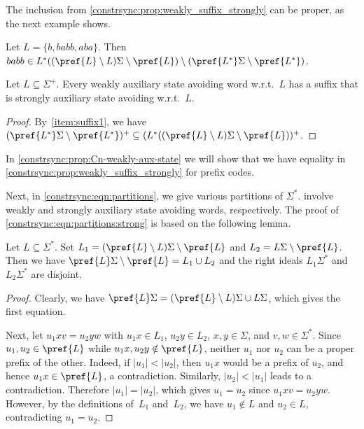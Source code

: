 The inclusion from \cref{constrsync:prop:weakly_suffix_strongly} can be proper,
as the next example shows.

\begin{example}
	Let $L = \{b, babb, aba\}$.
	Then $babb \in L^* ( ( \pref{L} \setminus L )\Sigma \setminus \pref{L} ) \setminus ( \pref{L^*}\Sigma  \setminus \pref{L^*} )$.
\end{example} 

\begin{corollary} \label{constrsync:cor:weakly_suffix_strongly}  \label{item:suffix2}
	Let $L \subseteq \Sigma^+$. Every weakly auxiliary state avoiding word w.r.t.~$L$
	has a suffix that is strongly auxiliary state avoiding w.r.t.~$L$.
\end{corollary}
\begin{proof}
	By~\cref{item:suffix1}, we have
	$(\pref{L^*}\Sigma  \setminus \pref{L^*})^+ \subseteq ( L^* ( ( \pref{L} \setminus L )\Sigma \setminus \pref{L} ) )^+$.	
\end{proof}

In \cref{constrsync:prop:Cn-weakly-aux-state}
we will show that 
we have equality in \cref{constrsync:prop:weakly_suffix_strongly}
for prefix codes.



Next, in \cref{constrsync:eqn:partitions}, we give various partitions of $\Sigma^*$.
involve weakly and strongly auxiliary state avoiding words, respectively.
The proof of \cref{constrsync:eqn:partitions:strong} is based on the following lemma.

\begin{lemma} \label{constrsync:lem:properpref}
	Let $L \subseteq \Sigma^*$.
	Set $L_1 = (\pref{L} \setminus L)\Sigma \setminus \pref{L}$
	and $L_2 =  L\Sigma  \setminus \pref{L}$.
	Then we have $\pref{L}\Sigma \setminus \pref{L} = L_1 \cup L_2$
	and the right ideals $L_1 \Sigma^*$
	and $L_2 \Sigma^*$ are disjoint.
\end{lemma}
\begin{proof}
	Clearly, we have $\pref{L}\Sigma = (\pref{L}\setminus L)\Sigma \cup L\Sigma$,
	which gives the first equation.		
	
	Next, let $u_1 x v = u_2 y w$
	with $u_1x \in L_1$, $u_2y \in L_2$, $x,y \in \Sigma$, and $v,w \in \Sigma^*$.
	Since $u_1, u_2 \in \pref{L}$ while $u_1x, u_2y \notin \pref{L}$,
	neither $u_1$ nor $u_2$ can be a proper prefix of the other.
	Indeed, if $|u_1| < |u_2|$, then $u_1x$ would be a prefix of $u_2$,
	and hence $u_1 x \in \pref{L}$, a contradiction.
	Similarly, $|u_2| < |u_1|$ leads to a contradiction. Therefore $|u_1| = |u_2|$,
	which gives $u_1 = u_2$ since $u_1 x v = u_2 y w$.
	However, by the definitions of~$L_1$ and~$L_2$,
	we have $u_1 \notin L$ and $u_2 \in L$, contradicting $u_1 = u_2$.	
\end{proof}

